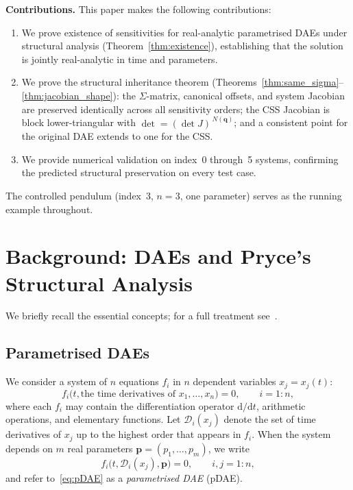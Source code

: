 \documentclass[12pt,a4paper]{article}
\theoremstyle{definition}
\theoremstyle{plain}
\theoremstyle{remark}
\newcommand{\vp}{\mathbf{p}}
\newcommand{\vq}{\mathbf{q}}
\newcommand{\derof}[2]{\mathcal{D}_{#1}\!\left(#2\right)\!}
\begin{document}
\medskip\noindent\textbf{Contributions.}
This paper makes the following contributions:
\begin{enumerate}[nosep]
  \item We prove existence of sensitivities for real-analytic parametrised DAEs under structural analysis (Theorem~\ref{thm:existence}), establishing that the solution is jointly real-analytic in time and parameters.
  \item We prove the structural inheritance theorem (Theorems~\ref{thm:same_sigma}--\ref{thm:jacobian_shape}): the $\Sigma$-matrix, canonical offsets, and system Jacobian are preserved identically across all sensitivity orders; the CSS Jacobian is block lower-triangular with $\det = (\det J)^{\,N(\vq)}$; and a consistent point for the original DAE extends to one for the CSS.
  \item We provide numerical validation on index~0 through~5 systems, confirming the predicted structural preservation on every test case.
\end{enumerate}

The controlled pendulum (index~3, $n=3$, one parameter) serves as the running example throughout.

\section{Background: DAEs and Pryce's Structural Analysis}

We briefly recall the essential concepts; for a full treatment see~\cite{pryce2001simple}.

\subsection{Parametrised DAEs}

We consider a system of $n$ equations $f_i$ in $n$ dependent variables $x_j = x_j(t)$:
\begin{equation}\label{eq:DAE}
  f_i\bigl(t, \text{the time derivatives of } x_1,\dots,x_n\bigr) = 0,\qquad i = 1:n,
\end{equation}
where each $f_i$ may contain the differentiation operator $\mathrm{d}/\mathrm{d}t$, arithmetic operations, and elementary functions. Let $\derof{i}{x_j}$ denote the set of time derivatives of $x_j$ up to the highest order that appears in $f_i$. When the system depends on $m$ real parameters $\vp = (p_1,\dots,p_m)$, we write
\begin{equation}\label{eq:pDAE}
  f_i\bigl(t, \derof{i}{x_j}, \vp\bigr) = 0,\qquad i,j = 1:n,
\end{equation}
and refer to~\eqref{eq:pDAE} as a \emph{parametrised DAE} (pDAE).
\end{document}
